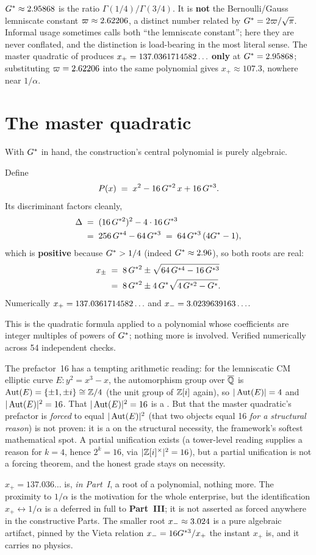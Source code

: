  $G^{*}\approx2.95868$ is
the ratio $\Gamma(1/4)/\Gamma(3/4)$. It is \textbf{not} the Bernoulli/Gauss
lemniscate constant $\varpi\approx2.62206$, a distinct number related by
$G^{*}=2\varpi/\sqrt\pi$. Informal usage sometimes calls both ``the lemniscate
constant''; here they are never conflated, and the distinction is load-bearing in
the most literal sense. The master quadratic of  produces
$x_+=137.0361714582\ldots$ \textbf{only} at $G^{*}=2.95868$; substituting
$\varpi=2.62206$ into the same polynomial gives $x_+\approx107.3$, nowhere
near $1/\alpha$.

\section{The master quadratic}\label{sec:masterquad}
With $G^{*}$ in hand, the construction's central polynomial is purely algebraic.

\begin{forcedbox}
Define
\[ P(x) \;=\; x^{2} - 16\,G^{*2}\,x + 16\,G^{*3}. \]
Its discriminant factors cleanly,
\[ \begin{aligned} \Delta &\;=\; (16\,G^{*2})^{2} - 4\cdot 16\,G^{*3} \\ &\;=\; 256\,G^{*4} - 64\,G^{*3} \;=\; 64\,G^{*3}\,(4G^{*} - 1), \end{aligned} \]
which is \textbf{positive} because $G^{*}>1/4$ (indeed $G^{*}\approx2.96$), so both
roots are real:
\[ \begin{aligned} x_{\pm} &\;=\; 8\,G^{*2} \pm \sqrt{64\,G^{*4} - 16\,G^{*3}} \\ &\;=\; 8\,G^{*2} \pm 4\,G^{*}\sqrt{4\,G^{*2} - G^{*}}. \end{aligned} \]
Numerically $x_+=137.0361714582\ldots$ and $x_-=3.0239639163\ldots$.
\end{forcedbox}

\noindent This is the quadratic formula applied to a polynomial whose
coefficients are integer multiples of powers of $G^{*}$; nothing more is involved.
Verified numerically across 54 independent checks.

 The
prefactor~16 has a tempting arithmetic reading: for the lemniscatic CM elliptic
curve $E:y^2=x^3-x$, the automorphism group over $\overline{\mathbb{Q}}$ is
$\operatorname{Aut}(E)=\{\pm1,\pm i\}\cong\mathbb{Z}/4$ (the unit group of $\mathbb{Z}[i]$ again), so
$|\operatorname{Aut}(E)|=4$ and $|\operatorname{Aut}(E)|^2=16$. That $|\operatorname{Aut}(E)|^2=16$ is a . But
that the master quadratic's prefactor is \emph{forced} to equal $|\operatorname{Aut}(E)|^2$ (that
two objects equal 16 \emph{for a structural reason}) is not proven: it is a
 on the structural necessity, the framework's softest mathematical
spot. A partial unification exists (a tower-level reading supplies a reason for
$k=4$, hence $2^k=16$, via $|\mathbb{Z}[i]^{\times}|^2=16$), but a partial unification is not a
forcing theorem, and the honest grade stays  on necessity.

 $x_+=137.036\ldots$ is, \emph{in Part~I}, a root of a
polynomial, nothing more. The proximity to $1/\alpha$ is the motivation for
the whole enterprise, but the identification $x_+ \leftrightarrow 1/\alpha$ is a
 deferred in full to \textbf{Part~III}; it is not asserted as forced
anywhere in the constructive Parts. The smaller root $x_-\approx3.024$ is
a pure algebraic artifact, pinned by the Vieta relation $x_-=16G^{*3}/x_+$ the
instant $x_+$ is, and it carries no physics.

